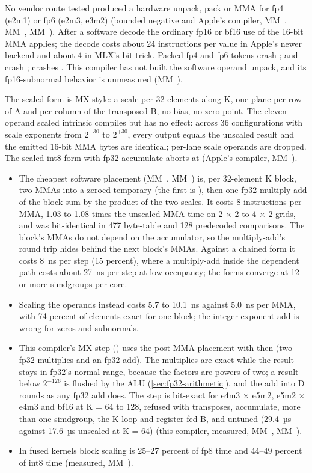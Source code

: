 No vendor route tested produced a hardware unpack, pack or MMA for fp4 (e2m1) or fp6 (e2m3, e3m2) (bounded negative
and Apple's compiler, MM~, MM~, MM~). After a software decode the ordinary fp16 or
bf16 use of the 16-bit MMA applies; the decode costs about 24 instructions per value in Apple's newer backend and about 4 in MLX's bit
trick. Packed fp4 and fp6 tokens crash ;  and  crash ;
 crashes . This compiler has not built the software operand unpack, and its fp16-subnormal behavior is unmeasured
(MM~).

The scaled  form is MX-style: a 
scale per 32 elements along K, one plane per row of A and per column of the transposed B, no bias, no zero point. The
eleven-operand scaled intrinsic compiles but has no effect: across 36 configurations with scale exponents from $2^{-30}$
to $2^{+30}$, every output equals the unscaled result and the emitted 16-bit MMA bytes are identical; per-lane scale operands
are dropped. The scaled int8 form with fp32
accumulate aborts at  (Apple's compiler, MM~).

\begin{itemize}
\item The cheapest software placement (MM~, MM~) is, per 32-element K block, two MMAs into a zeroed
  temporary (the first is ), then one fp32 multiply-add of the block sum by the product of the two scales. It
  costs 8 instructions per MMA, 1.03 to 1.08 times the unscaled MMA time on 2 × 2 to 4 × 2 grids, and was bit-identical in 477 byte-table
  and 128 predecoded comparisons. The block's MMAs do not depend on the accumulator, so the multiply-add's
  round trip hides behind the next block's MMAs. Against a chained form it costs 8~ns per step (15 percent), where a
  multiply-add inside the dependent path costs about 27~ns per step at low occupancy; the forms converge at 12 or more
  simdgroups per core.
\item Scaling the operands instead costs 5.7 to 10.1~ns against 5.0~ns per MMA, with 74 percent of elements exact for
  one block; the integer exponent add is wrong for zeros and subnormals.
\item This compiler's MX step () uses the post-MMA placement with  then  (two fp32
  multiplies and an fp32 add). The multiplies are exact while the result stays in fp32's normal range, because the
  factors are powers of two; a result below $2^{-126}$ is flushed by the ALU (\cref{sec:fp32-arithmetic}), and the add
  into D rounds as any fp32 add does. The step is bit-exact for e4m3 × e5m2, e5m2 ×
  e4m3 and bf16 at K = 64 to 128, refused with transposes, accumulate, more than one simdgroup, the K loop and
  register-fed B, and untuned (29.4~µs against 17.6~µs unscaled at K = 64) (this compiler, measured, MM~,
  MM~).
\item In fused kernels block scaling is 25–27 percent of fp8 time and 44–49 percent of int8 time (measured, MM~).
\end{itemize}

